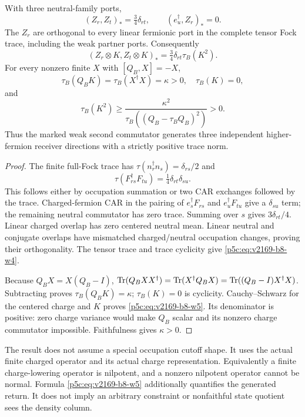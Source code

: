 \documentclass[12pt,a4paper]{article}
\begin{document}
\begin{theorem}
\label{p5c:v2169:b8:thm:densitygram}
With three neutral-family ports,
\begin{equation}
 \boxed{(Z_r,Z_t)_*=\tfrac34\delta_{rt},\qquad
 (e_u^\dagger,Z_r)_*=0.}
 \label{p5c:eq:v2169-b8-w3}
\end{equation}
The $Z_r$ are orthogonal to every linear fermionic port in the complete
tensor Fock trace, including the weak partner ports. Consequently
\begin{equation}
 \boxed{(Z_r\otimes K,Z_t\otimes K)_*
          =\tfrac34\delta_{rt}\tau_B(K^2).}
 \label{p5c:eq:v2169-b8-w4}
\end{equation}
For every nonzero finite $X$ with $[Q_B,X]=-X$,
\[
 \tau_B(Q_BK)=\tau_B(X^\dagger X)=\kappa>0,\quad \tau_B(K)=0,
\]
and
\begin{equation}
 \boxed{\tau_B(K^2)\geq
   \frac{\kappa^2}{\tau_B((Q_B-\tau_BQ_B)^2)}>0.}
 \label{p5c:eq:v2169-b8-w5}
\end{equation}
Thus the marked weak second commutator generates three independent
higher-fermion receiver directions with a strictly positive trace norm.
\end{theorem}
\begin{proof}
The finite full-Fock trace has $\tau(n_r^\dagger n_s)=\delta_{rs}/2$ and
\[
 \tau(F_{rs}^\dagger F_{tu})=\tfrac14\delta_{rt}\delta_{su}.
\]
This follows either by occupation summation or two CAR exchanges followed by
the trace. Charged-fermion CAR in the pairing of
$e_s^\dagger F_{rs}$ and $e_u^\dagger F_{tu}$ give a $\delta_{su}$ term;
the remaining neutral commutator has zero trace. Summing over $s$ gives
$3\delta_{rt}/4$. Linear charged overlap has zero centered neutral mean.
Linear neutral and conjugate overlaps have mismatched charged/neutral
occupation changes, proving their orthogonality. The tensor trace and
trace cyclicity give \eqref{p5c:eq:v2169-b8-w4}.

Because $Q_BX=X(Q_B-I)$,
$\operatorname{Tr}(Q_BXX^\dagger)=\operatorname{Tr}(X^\dagger Q_BX)
=\operatorname{Tr}((Q_B-I)X^\dagger X)$. Subtracting proves
$\tau_B(Q_BK)=\kappa$; $\tau_B(K)=0$ is cyclicity. Cauchy--Schwarz for
the centered charge and $K$ proves \eqref{p5c:eq:v2169-b8-w5}. Its denominator is positive: zero
charge variance would make $Q_B$ scalar and its nonzero charge commutator
impossible. Faithfulness gives $\kappa>0$.
\end{proof}

The result does not assume a special occupation cutoff shape. It uses the
actual finite charged operator and its actual charge representation.
Equivalently a finite charge-lowering operator is nilpotent, and a nonzero
nilpotent operator cannot be normal. Formula \eqref{p5c:eq:v2169-b8-w5} additionally quantifies
the generated return. It does not imply an arbitrary constraint or
nonfaithful state quotient sees the density column.
\end{document}
